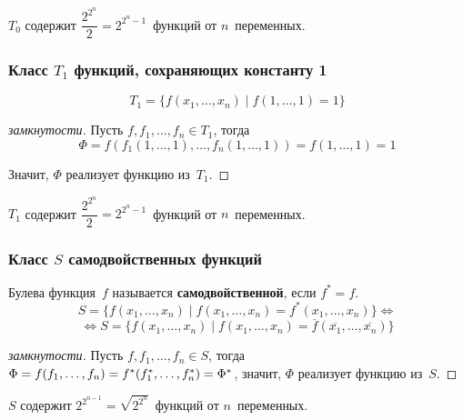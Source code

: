 $T_0$ содержит $\dfrac{2^{2^n}}2 = 2^{2^n - 1}$~функций от $n$~переменных.

\subsubsection{Класс \texorpdfstring{$T_1$}{} функций, сохраняющих константу 1}
\begin{equation*}
T_1 = \{ f(x_1, \ldots, x_n) \mid f(1, \ldots, 1) = 1 \}
\end{equation*}
\begin{proof}[замкнутости]
Пусть $f, f_1, \ldots, f_n \in T_1$, тогда
\begin{equation*}
\Phi =
f(f_1(1, \ldots, 1), \ldots, f_n(1, \ldots, 1)) =
f(1, \ldots, 1) = 1
\end{equation*}

Значит, $\Phi$ реализует функцию из~$T_1$.
\end{proof}

$T_1$ содержит $\dfrac{2^{2^n}}2 = 2^{2^n - 1}$~функций от $n$~переменных.

\subsubsection{Класс \texorpdfstring{$S$}{} самодвойственных функций}
 Булева функция~$f$ называется \textbf{самодвойственной}, если $f^* = f$.
\begin{equation*}
S = \{ f(x_1, \ldots, x_n) \mid
f(x_1, \ldots, x_n) = f^*(x_1, \ldots, x_n) \} \Leftrightarrow
\end{equation*}
\begin{equation*}
\Leftrightarrow S = \{ f(x_1, \ldots, x_n) \mid
f(x_1, \ldots, x_n) = \overline f(\overline{x_1}, \ldots, \overline{x_n}) \}
\end{equation*}
\begin{proof}[замкнутости]
Пусть $f, f_1, \ldots, f_n \in S$, тогда $\Phi = f(f_1, \ldots, f_n) \opbr= f^*(f_1^*, \ldots, f_n^*) \opbr= \Phi^*$, значит, $\Phi$ реализует функцию из~$S$.
\end{proof}

$S$ содержит $2^{2^{n-1}} = \sqrt{2^{2^n}}$~функций от $n$~переменных.

